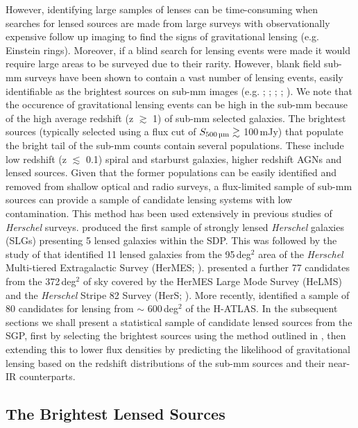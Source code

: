 However, identifying large samples of lenses can be time-consuming when searches for lensed sources are made from large surveys with observationally expensive follow up imaging to find the signs of gravitational lensing (e.g. Einstein rings). Moreover, if a blind search for lensing events were made it would require large areas to be surveyed due to their rarity. However, blank field sub-mm surveys have been shown to contain a vast number of lensing events, easily identifiable as the brightest sources on sub-mm images (e.g. \citealt{Blain_1996}; \citealt{Perrotta_2002}; \citealt{Negrello_2007}; \citealt{Paciga_2009}; \citealt{Bakx_2020}). We note that the occurence of gravitational lensing events can be high in the sub-mm because of the high average redshift (z $\gtrsim$ 1) of sub-mm selected galaxies. The brightest sources (typically selected using a flux cut of $S_{\textrm{500\,\micron}} \gtrsim$ 100\,mJy) that populate the bright tail of the sub-mm counts contain several populations. These include low redshift (z $\lesssim$ 0.1) spiral and starburst galaxies, higher redshift AGNs and lensed sources. Given that the former populations can be easily identified and removed from shallow optical and radio surveys, a flux-limited sample of sub-mm sources can provide a sample of candidate lensing systems with low contamination. This method has been used extensively in previous studies of \textit{Herschel} surveys. \citealt{Negrello_2010} produced the first sample of strongly lensed \textit{Herschel} galaxies (SLGs) presenting 5 lensed galaxies within the SDP. This was followed by the study of \citealt{Wardlow_2013} that identified 11 lensed galaxies from the 95\,deg$^{2}$ area of the \textit{Herschel} Multi-tiered Extragalactic Survey (HerMES; \citealt{Oliver_2012}). \citealt{Nayyeri_2016} presented a further 77 candidates from the 372\,deg$^{2}$ of sky covered by the HerMES Large Mode Survey (HeLMS) and the \textit{Herschel} Stripe 82 Survey (HerS; \citealt{Viero_2014}). More recently, \citealt{Negrello_2017} identified a sample of 80 candidates for lensing from $\sim$ 600\,deg$^{2}$ of the H-ATLAS. In the subsequent sections we shall present a statistical sample of candidate lensed sources from the SGP, first by selecting the brightest sources using the method outlined in \citealt{Negrello_2017}, then extending this to lower flux densities by predicting the likelihood of gravitational lensing based on the redshift distributions of the sub-mm sources and their near-IR counterparts. 

\subsection{The Brightest Lensed Sources}
\label{sec:brightest_lenses}

